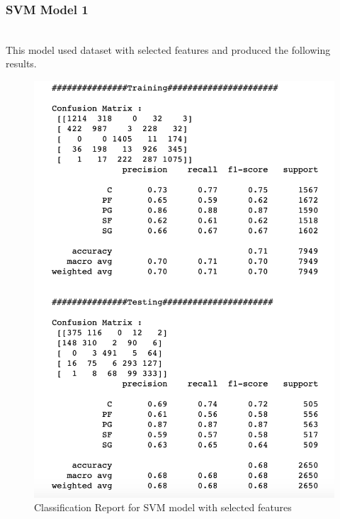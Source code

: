 \documentclass[format=sigconf]{acmart}
\begin{document}
\subsubsection{SVM Model 1}
\hfill\\
This model used dataset with selected features and produced the following results.
\begin{figure}[h]
    \centering
    \includegraphics[scale=0.40]{images/SVM-Model-2-1-selected-features.png}
    \caption{Classification Report for SVM model with selected features}
    \label{fig:svmmodel21}
\end{figure}
\newpage
\end{document}
